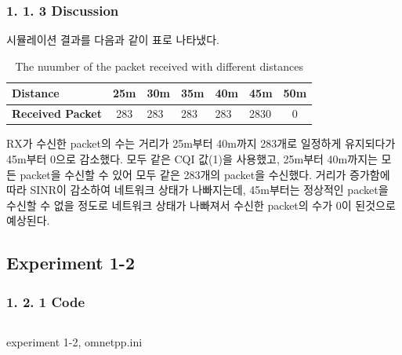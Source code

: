    \subsubsection*{1. 1. 3 Discussion}
    \vspace{-3mm}
        시뮬레이션 결과를 다음과 같이 표로 나타냈다.\\
        
        \vspace{-3mm}
        \begin{table}[h!]
        \centering
            \begin{tabular}{|l|l|l|l|l|l|l|}
            \hline
            \textbf{Distance} & 25m & 30m & 35m & 40m & 45m & 50m \\
            \hline
            \multicolumn{1}{|c|}{\textbf{Received Packet}} & \multicolumn{1}{|c|}{283} & 283 & 283 & 283 & 2830 & \multicolumn{1}{|c|}{0} \\
            \hline
            \end{tabular}
            \caption{The nuumber of the packet received with different distances}
        \end{table}
        \vspace{-3mm}
        
        RX가 수신한 packet의 수는 거리가 25m부터 40m까지 283개로 일정하게 유지되다가 45m부터 0으로 감소했다. 모두 같은 CQI 값(1)을 사용했고, 25m부터 40m까지는 모든 packet을 수신할 수 있어 모두 같은 283개의 packet을 수신했다. 거리가 증가함에 따라 SINR이 감소하여 네트워크 상태가 나빠지는데, 45m부터는 정상적인 packet을 수신할 수 없을 정도로 네트워크 상태가 나빠져서 수신한 packet의 수가 0이 된것으로 예상된다. 
        
        
\subsection*{Experiment 1-2}
    \subsubsection*{1. 2. 1 Code}
    \vspace{-3mm}
            \vspace{-2mm}
            \begin{listing}[h!]
            \inputminted[framerule = 1pt,framesep = 2mm , frame = lines, fontsize=\footnotesize]{c}{./code/week11/Experiment_01/omnet2.cpp}
            \vspace{-3mm}
            \caption{\footnotesize experiment 1-2, omnetpp.ini}
            \end{listing}
            \vspace{-6mm}
